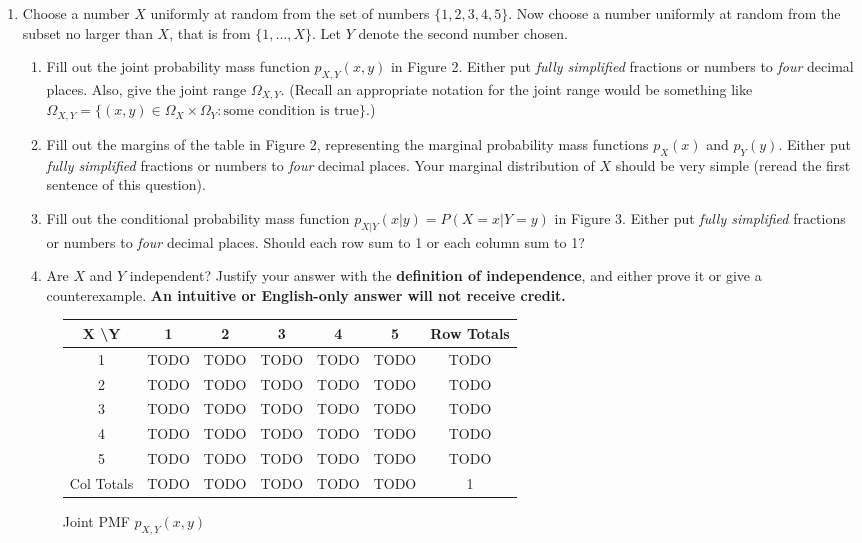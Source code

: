 \documentclass[12pt]{article}
\renewcommand{\|}{\mid}
\begin{document}
\begin{enumerate}
\item Choose a number $X$ uniformly at random from the set of numbers $\{1, 2, 3, 4, 5\}$. Now choose a number uniformly at random from the subset no larger than $X$, that is from $\{1, . . ., X\}$. Let $Y$ denote the second number chosen.
\begin{enumerate}
    \item Fill out the joint probability mass function $p_{X,Y}(x,y)$ in Figure 2. Either put \textit{fully simplified} fractions or numbers to \textit{four} decimal places. Also, give the joint range $\Omega_{X,Y}$. (Recall an appropriate notation for the joint range would be something like $\Omega_{X,Y}=\{(x,y)\in\Omega_{X}\times\Omega_Y:\text{some condition is true}\}$.)
    \item Fill out the margins of the table in Figure 2, representing the marginal probability mass functions $p_X(x)$ and $p_Y(y)$. Either put \textit{fully simplified} fractions or numbers to \textit{four} decimal places. Your marginal distribution of $X$ should be very simple (reread the first sentence of this question).
    \item Fill out the conditional probability mass function $p_{X|Y}(x|y)=P(X=x|Y=y)$ in Figure 3. Either put \textit{fully simplified} fractions or numbers to \textit{four} decimal places. Should each row sum to 1 or each column sum to 1?
    \item Are $X$ and $Y$ independent? Justify your answer with the \textbf{definition of independence}, and either prove it or give a counterexample. \textbf{An intuitive or English-only answer will not receive credit.}
\end{enumerate}

{
\begin{figure}[h]
\caption{Joint PMF $p_{X,Y}(x,y)$}
\centering
\begin{center}
 \begin{tabular}{|c |c |c| c| c| c|c|} 
 \hline
 X \textbackslash Y & 1 & 2 & 3 & 4 & 5 & Row Totals \\ [0.5ex] 
 \hline
 1 & TODO & TODO & TODO & TODO & TODO & TODO \\ 
 \hline
 2 & TODO & TODO & TODO & TODO & TODO & TODO \\
 \hline
 3 & TODO & TODO & TODO & TODO & TODO & TODO\\
 \hline
 4 & TODO & TODO & TODO & TODO & TODO & TODO\\
 \hline
 5 & TODO & TODO & TODO & TODO & TODO & TODO\\ 
 \hline
 Col Totals & TODO & TODO & TODO & TODO & TODO & 1\\ 
 \hline
\end{tabular}
\end{center}\end{figure}}


\end{enumerate}
\end{document}
